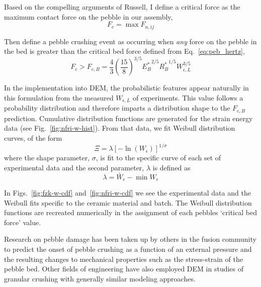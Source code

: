 Based on the compelling arguments of Russell\etal, I define a critical force as the maximum contact force on the pebble in our assembly,
\begin{equation}
	F_{c} = \max F_{n,ij}
\end{equation}

Then define a pebble crushing event as occurring when \textit{any} force on the pebble in the bed is greater than the critical bed force defined from Eq.~\ref{eq:peb_hertz},
\begin{equation}\label{eq:crush-predict}
  F_{c} > F_{c,B} = \frac{4}{3}\left(\frac{15}{8}\right)^{3/5}{E_B^*}^{2/5}{R_B^*}^{1/5}W_{\epsilon,L}^{3/5}
\end{equation}

In the implementation into DEM, the probabilistic features appear naturally in this formulation from the measured $W_{\epsilon,L}$ of experiments. This value follows a probability distribution and therefore imparts a distribution shape to the $F_{c,B}$ prediction. Cumulative distribution functions are generated for the strain energy data (see Fig.~\ref{fig:nfri-w-hist}). From that data, we fit Weibull distribution curves, of the form
\begin{equation}
	\Xi = \lambda\left[-\ln(W_\epsilon)\right]^{1/\sigma}
\end{equation}
where the shape parameter, $\sigma$, is fit to the specific curve of each set of experimental data and the second parameter, $\lambda$ is defined as
\[
\lambda = \bar{W}_\epsilon - \min W_\epsilon
\]

In Figs.~\ref{fig:fzk-w-cdf} and~\ref{fig:nfri-w-cdf} we see the experimental data and the Weibull fits specific to the ceramic material and batch. The Weibull distribution functions are recreated numerically in the assignment of each pebbles `critical bed force' value.


Research on pebble damage has been taken up by others in the fusion community to predict the onset of pebble crushing as a function of an external pressure and the resulting changes to mechanical properties such as the stress-strain of the pebble bed.\cite{Annabattula2012a, Zhao2012, Zhao2013} Other fields of engineering have also employed DEM in studies of granular crushing with generally similar modeling approaches.\cite{Marketos2007,Pitchumani2004}


